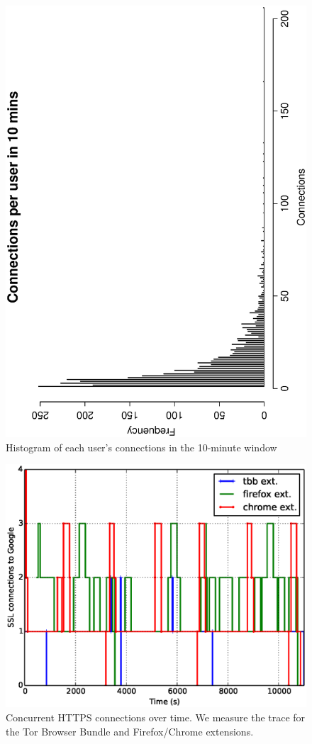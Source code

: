\documentclass[conference]{IEEEtran}
\begin{document}
\begin{figure}
\centering
\includegraphics[height=\linewidth, angle=270]{figs/connections-google.eps}
\caption{Histogram of each user's connections in the 10-minute window}
\label{fig:connections}
\end{figure}
\begin{figure}
\centering
\includegraphics[width=\linewidth]{figs/conns.eps}
\caption{Concurrent HTTPS connections over time. We measure the trace for the Tor Browser Bundle and Firefox/Chrome extensions.}
\label{fig:conconns}
\end{figure}
\end{document}

